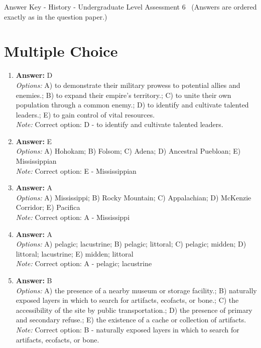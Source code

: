 \documentclass[12pt]{article}
\begin{document}
\begin{center}
Answer Key - History - Undergraduate Level Assessment 6 \
\small (Answers are ordered exactly as in the question paper.)
\end{center}

\section*{Multiple Choice}
\begin{enumerate}[label=\arabic*.]
\item \textbf{Answer:} D
\\ \textit{Options:} A) to demonstrate their military prowess to potential allies and enemies.; B) to expand their empire's territory.; C) to unite their own population through a common enemy.; D) to identify and cultivate talented leaders.; E) to gain control of vital resources.
\\ \textit{Note:} Correct option: D - to identify and cultivate talented leaders.
\item \textbf{Answer:} E
\\ \textit{Options:} A) Hohokam; B) Folsom; C) Adena; D) Ancestral Puebloan; E) Mississippian
\\ \textit{Note:} Correct option: E - Mississippian
\item \textbf{Answer:} A
\\ \textit{Options:} A) Mississippi; B) Rocky Mountain; C) Appalachian; D) McKenzie Corridor; E) Pacifica
\\ \textit{Note:} Correct option: A - Mississippi
\item \textbf{Answer:} A
\\ \textit{Options:} A) pelagic; lacustrine; B) pelagic; littoral; C) pelagic; midden; D) littoral; lacustrine; E) midden; littoral
\\ \textit{Note:} Correct option: A - pelagic; lacustrine
\item \textbf{Answer:} B
\\ \textit{Options:} A) the presence of a nearby museum or storage facility.; B) naturally exposed layers in which to search for artifacts, ecofacts, or bone.; C) the accessibility of the site by public transportation.; D) the presence of primary and secondary refuse.; E) the existence of a cache or collection of artifacts.
\\ \textit{Note:} Correct option: B - naturally exposed layers in which to search for artifacts, ecofacts, or bone.
\end{enumerate}
\end{document}

